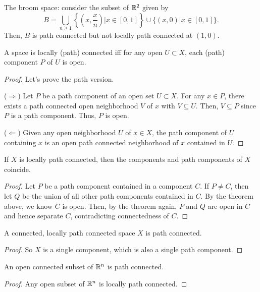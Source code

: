 \begin{example}
    The broom space: consider the subset of $\mathbb{R}^2$ given by
    \[B=\bigcup_{n\geq 1}\left\{\left(x,\frac{x}{n}\right)|x\in [0,1]\right\}\cup \{(x,0)|x\in[0,1]\}.\]
    Then, $B$ is path connected but not locally path connected at $(1,0)$.
\end{example}

\begin{theorem}
    A space is locally (path) connected iff for any open $U\subset X$, each (path) component $P$ of $U$ is open.
\end{theorem}
\begin{proof}
    Let's prove the path version. 

    ($\Rightarrow$) Let $P$ be a path component of an open set $U\subset X$. For any $x\in P$, there exists a path connected open neighborhood $V$ of $x$ with $V\subseteq U$. Then, $V\subseteq P$ since $P$ is a path component. Thus, $P$ is open.

    ($\Leftarrow$) Given any open neighborhood $U$ of $x\in X$, the path component of $U$ containing $x$ is an open path connected neighborhood of $x$ contained in $U$.
\end{proof}

\begin{theorem}
    If $X$ is locally path connected, then the components and path components of $X$ coincide.
\end{theorem}
\begin{proof}
    Let $P$ be a path component contained in a component $C$. If $P\neq C$, then let $Q$ be the union of all other path components contained in $C$. By the theorem above, we know $C$ is open. Then, by the theorem again, $P$ and $Q$ are open in $C$ and hence separate $C$, contradicting connectedness of $C$.
\end{proof}


\begin{corollary}
    A connected, locally path connected space $X$ is path connected.
\end{corollary}
\begin{proof}
    So $X$ is a single component, which is also a single path component.
\end{proof}

\begin{corollary}
    An open connected subset of $\mathbb{R}^n$ is path connected.
\end{corollary}
\begin{proof}
    Any open subset of $\mathbb{R}^n$ is locally path connected.
\end{proof}


